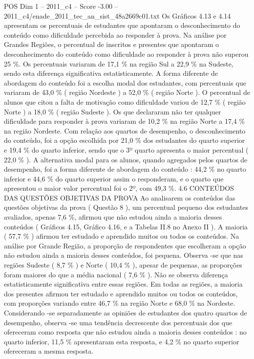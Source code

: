 \begin{textsample}{POS Dim 1 – 2011\_c4 – Score -3.00 – 2011\_c4/enade\_2011\_tec\_an\_sist\_48a2669c01.txt}
Os Gráficos 4.13 e 4.14 apresentam os percentuais de estudantes que apontaram o desconhecimento do conteúdo como dificuldade percebida ao responder à prova.
Na análise por Grandes Regiões, o percentual de inscritos e presentes que apontaram o desconhecimento do conteúdo como dificuldade ao responder à prova não superou 25 \%.
Os percentuais variaram de 17,1 \% na região Sul a 22,9 \% na Sudeste, sendo esta diferença significativa estatisticamente.
A forma diferente de abordagem do conteúdo foi a escolha modal dos estudantes, com percentuais que variaram de 43,0 \% ( região Nordeste ) a 52,0 \% ( região Norte ).
O percentual de alunos que citou a falta de motivação como dificuldade variou de 12,7 \% ( região Norte ) a 18,0 \% ( região Sudeste ).
Os que declararam não ter qualquer dificuldade para responder à prova variaram de 10,2 \% na região Norte a 17,4 \% na região Nordeste.
Com relação aos quartos de desempenho, o desconhecimento do conteúdo, foi a opção escolhida por 21,0 \% dos estudantes do quarto superior e 19,4 \% do quarto inferior, sendo que o 3º quarto apresenta o maior percentual ( 22,0 \% ).
A alternativa modal para os alunos, quando agregados pelos quartos de desempenho, foi a forma diferente de abordagem do conteúdo : 44,2 \% no quarto inferior e 44,6 \% do quarto superior assim o responderam, e o quarto que apresentou o maior valor percentual foi o 2º, com 49,3 \%. 4.6 CONTEÚDOS DAS QUESTÕES OBJETIVAS DA PROVA Ao analisarem os conteúdos das questões objetivas da prova ( Questão 8 ), um percentual pequeno dos estudantes avaliados, apenas 7,6 \%, afirmou que não estudou ainda a maioria desses conteúdos ( Gráficos 4.15, Gráfico 4.16, e a Tabelas II.8 no Anexo II ).
A maioria ( 57,7 \% ) afirmou ter estudado e aprendido muitos ou todos os conteúdos.
Na análise por Grande Região, a proporção de respondentes que escolheram a opção não estudou ainda a maioria desses conteúdos, foi pequena.
Observa -se que nas regiões Sudeste ( 8,7 \% ) e Norte ( 10,4 \% ), apesar de pequenas, as proporções foram maiores do que a média nacional ( 7,6 \% ).
Não se observa diferença estatisticamente significativa entre essas regiões.
Em todas as regiões, a maioria dos presentes afirmou ter estudado e aprendido muitos ou todos os conteúdos, com proporções variando entre 46,7 \% na região Norte e 68,0 \% na Nordeste.
Considerando -se separadamente as opiniões de estudantes dos quatro quartos de desempenho, observa -se uma tendência decrescente dos percentuais dos que ofereceram como resposta que não estudou ainda a maioria desses conteúdos : no quarto inferior, 11,5 \% apresentaram esta resposta, e 4,2 \% no quarto superior ofereceram a mesma resposta.

\end{textsample}
